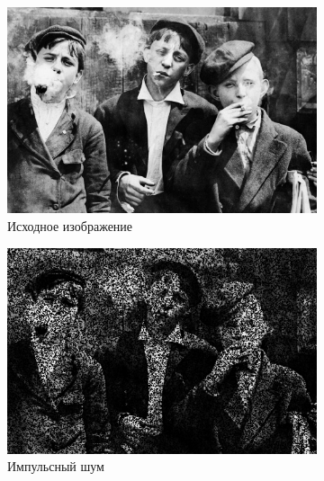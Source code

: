 \begin{figure}[ht!] 
    \centering
    \begin{subfigure}[b]{0.5\linewidth}
        \centering
        \includegraphics[width=0.95\linewidth]{../lewis-hine-taschen-main-3.jpg} 
        \caption{Исходное изображение} 
        \label{rang_3_1:a} 
        \vspace{4ex}
    \end{subfigure}%
    \begin{subfigure}[b]{0.5\linewidth}
      \centering
      \includegraphics[width=0.95\linewidth]{../Rang_Filter/Rang_Impulse_noise_(k=3,r=1).jpg} 
      \caption{Импульсный шум} 
      \label{rang_3_1:b} 
      \vspace{4ex}
    \end{subfigure}
    \begin{subfigure}[b]{0.5\linewidth}
      \centering

\end{subfigure}
\end{figure}
